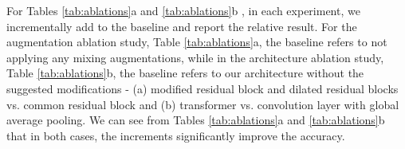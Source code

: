 \noindent For Tables \ref{tab:ablations}a and \ref{tab:ablations}b , in each experiment, we incrementally add to the baseline and report the relative result. 
For the augmentation ablation study, Table \ref{tab:ablations}a, the baseline refers to not applying any mixing augmentations, while in the architecture ablation study, Table \ref{tab:ablations}b, the baseline refers to our architecture without the suggested modifications - (a) modified residual block and dilated residual blocks vs. common residual block and (b) transformer vs. convolution layer with global average pooling.
We can see from Tables \ref{tab:ablations}a and \ref{tab:ablations}b that in both cases, the increments significantly improve the accuracy.
